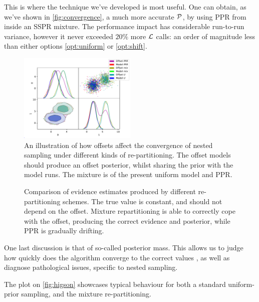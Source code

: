 \documentclass[usenatbib]{mnras}
\begin{document}
This is where the technique we've developed is most useful. One can
obtain, as we've shown in \autoref{fig:convergence}, a much more
accurate \({\cal P}\), by using PPR from inside an SSPR mixture. The
performance impact has considerable run-to-run variance, however it
never exceeded \(20\%\) more \({\cal L}\) calls: an order of
magnitude less than either options \ref{opt:uniform} or \ref{opt:shift}.

\begin{figure}
\includegraphics[width=0.5\textwidth]{./illustrations/convergence.pdf}
\caption{An illustration of how offsets affect the convergence of nested sampling under different kinds of re-partitioning. The offset models should produce an offset posterior, whilst sharing the prior with the model runs. The mixture is of the present uniform model and PPR. \label{fig:convergence}}
\end{figure}

\begin{figure}
  
\caption{Comparison of evidence estimates produced by different re-partitioning schemes. The true value is constant, and should not depend on the offset. Mixture repartitioning is able to correctly cope with the offset, producing the correct evidence and posterior, while PPR is gradually drifting. \label{fig:drift}}
\end{figure}


One last discussion is that of so-called posterior mass. This allows
us to judge how quickly does the algorithm converge to the correct
values \cite{higson2018nestcheck}, as well as diagnose pathological
issues, specific to nested sampling.

The plot on \autoref{fig:higson} showcases typical behaviour for both
a standard uniform-prior sampling, and the mixture re-partitioning.
\end{document}
